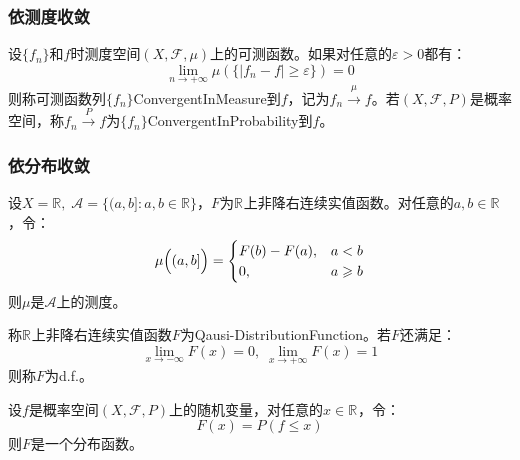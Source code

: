\subsubsection{依测度收敛}
\begin{definition}
	设$\{f_n\}$和$f$时测度空间$(X,\mathscr{F},\mu)$上的可测函数。如果对任意的$\varepsilon>0$都有：
	\begin{equation*}
		\lim_{n\to+\infty}\mu(\{|f_n-f|\geqslant\varepsilon\})=0
	\end{equation*}
	则称可测函数列$\{f_n\}$\gls{ConvergentInMeasure}到$f$，记为$f_n\overset{\mu}{\longrightarrow}f$。若$(X,\mathscr{F},P)$是概率空间，称$f_n\overset{P}{\longrightarrow}f$为$\{f_n\}$\gls{ConvergentInProbability}到$f$。
\end{definition}
\subsubsection{依分布收敛}
\begin{theorem}
	设$X=\mathbb{R},\;\mathscr{A}=\{(a,b]:a,b\in\mathbb{R}\}$，$F$为$\mathbb{R}^{}$上非降右连续实值函数。对任意的$a,b\in\mathbb{R}$，令：
	\begin{equation*}
		\mu\Bigl((a,b]\Bigr)=
		\begin{cases}
			F(b)-F(a),&a<b \\
			0,&a\geqslant b
		\end{cases}
	\end{equation*}
	则$\mu$是$\mathscr{A}$上的测度。
\end{theorem}
\begin{definition}
	称$\mathbb{R}^{}$上非降右连续实值函数$F$为\gls{Qausi-DistributionFunction}。若$F$还满足：
	\begin{equation*}
		\lim_{x\to-\infty}F(x)=0,\;\lim_{x\to+\infty}F(x)=1
	\end{equation*}
	则称$F$为\gls{d.f.}。
\end{definition}
\begin{theorem}
	设$f$是概率空间$(X,\mathscr{F},P)$上的随机变量，对任意的$x\in\mathbb{R}^{}$，令：
	\begin{equation*}
		F(x)=P(f\leqslant x)
	\end{equation*}
	则$F$是一个分布函数。
\end{theorem}
